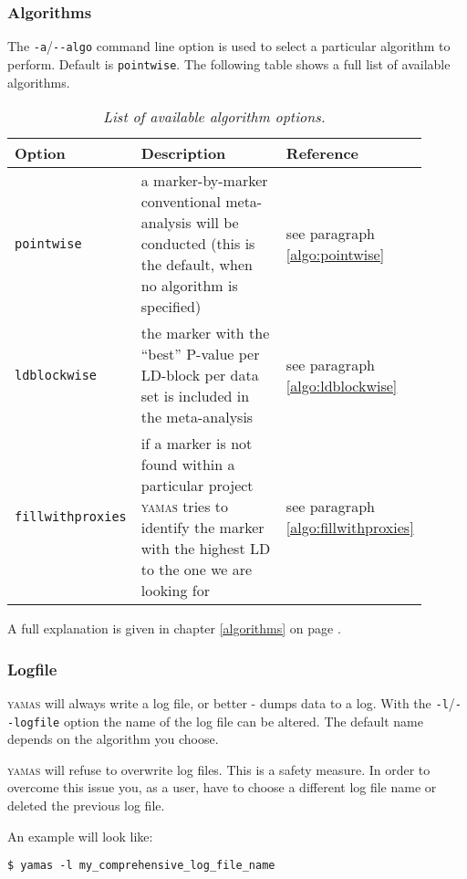 \subsubsection{Algorithms}
\label{usage:op:algorithms}
The \verb+-a+/\verb+--algo+ command line option is used to select a particular algorithm to perform. Default is \texttt{pointwise}. The following table shows a full list of available algorithms.\\
\begin{table}[H]
 \caption{\emph{List of available algorithm options.}}
 \centering
\begin{tabular}{p{0.2\linewidth}p{0.45\linewidth}p{0.25\linewidth}}
\rowcolor{light-gray}Option & Description & Reference\\\hline
\texttt{pointwise}  & a marker-by-marker conventional meta-analysis will be conducted (this is the default, when no algorithm is specified) & see paragraph \ref{algo:pointwise}\\
\texttt{ldblockwise} & the marker with the ``best'' P-value per LD-block per data set is included in the meta-analysis & see paragraph \ref{algo:ldblockwise}\\
\texttt{fillwithproxies} & if a marker is not found within a particular project \textsc{yamas} tries to identify the marker with the highest LD to the one we are looking for & see paragraph \ref{algo:fillwithproxies}\\
\end{tabular}
\end{table}
A full explanation is given in chapter \ref{algorithms} on page \pageref{algorithms}.

\subsubsection{Logfile}
\label{usage:op:logfile}
\textsc{yamas} will always write a log file, or better - dumps data to a log. With the \verb+-l+/\verb+--logfile+ option the name of the log file can be altered. The default name depends on the algorithm you choose.

\alert{\textsc{yamas} will refuse to overwrite log files. This is a safety measure. In order to overcome this issue you, as a user, have to choose a different log file name or deleted the previous log file.}

An example will look like:

\begin{lstlisting}[style=shell]
$ yamas -l my_comprehensive_log_file_name
\end{lstlisting}

